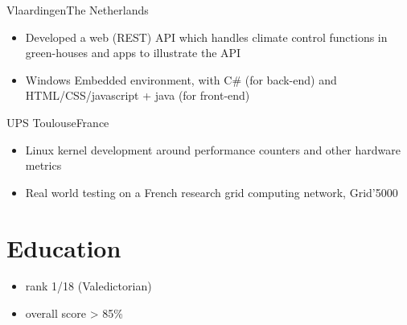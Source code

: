 \documentclass[a4paper,10pt,sans]{moderncv}
\begin{document}
{Vlaardingen}{The Netherlands}
{
  \begin{itemize}
  \item Developed a web (REST) API which handles climate control functions in green-houses and apps to illustrate the API
  \item Windows Embedded environment, with C\# (for back-end) and HTML/CSS/javascript + java (for front-end)
  \end{itemize}
}

{UPS Toulouse}{France}
{
  \begin{itemize}
    \item Linux kernel development around performance counters and other hardware metrics
    \item Real world testing on a French research grid computing network, Grid'5000
  \end{itemize}
}


\section{Education}
{
  \begin{itemize}
  \item rank 1/18 (Valedictorian)
  \item overall score > 85\%
  \end{itemize}
}
\end{document}
